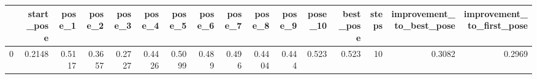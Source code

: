 \begin{tabular}{lrrrrrrrrrrrrrrr}
\toprule
{} &  start\_pose &  pose\_1 &  pose\_2 &  pose\_3 &  pose\_4 &  pose\_5 &  pose\_6 &  pose\_7 &  pose\_8 &  pose\_9 &  pose\_10 &  best\_pose &  steps &  improvement\_to\_best\_pose &  improvement\_to\_first\_pose \\
\midrule
0 &      0.2148 &  0.5117 &  0.3657 &  0.2727 &  0.4426 &  0.5099 &   0.489 &   0.496 &  0.4404 &   0.444 &    0.523 &      0.523 &     10 &                    0.3082 &                     0.2969 \\
\bottomrule
\end{tabular}
